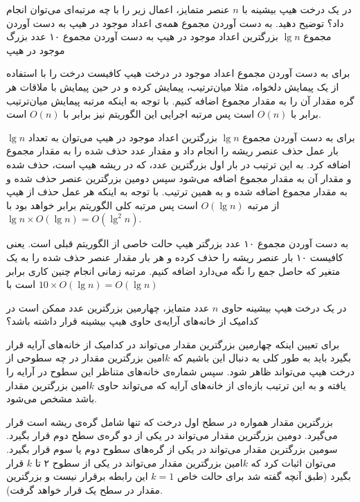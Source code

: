 
 در یک درخت هیپ بیشینه با {$n$} عنصر متمایز، اعمال زیر را با چه مرتبه‌ای می‌توان انجام داد؟ توضیح دهید.
 به دست آوردن مجموع همه‌ی اعداد موجود در هیپ
 به دست آوردن مجموع {$\lg n$} بزرگترین اعداد موجود در هیپ
 به دست آوردن مجموع ۱۰ عدد بزرگ موجود در هیپ


برای به دست آوردن مجموع  اعداد موجود در درخت هیپ کافیست درخت را با استفاده از یک پیمایش دلخواه، مثلا میان‌ترتیب، پیمایش کرده و در حین پیمایش با ملاقات هر گره مقدار آن را به مقدار مجموع اضافه کنیم. با توجه به اینکه مرتبه پیمایش میان‌ترتیب برابر با {$O(n)$} است پس مرتبه اجرایی این الگوریتم نیز برابر با {$O(n)$} است.

برای به دست آوردن مجموع {$\lg n$} بزرگترین اعداد موجود در هیپ می‌توان به تعداد {$\lg n$} بار عمل حذف عنصر ریشه را انجام داد و مقدار عدد حذف شده را به مقدار مجموع اضافه کرد. به این ترتیب در بار اول بزرگترین عدد، که در ریشه هیپ است، حذف شده و مقدار آن به مقدار مجموع اضافه می‌شود سپس دومین بزرگترین عنصر حذف شده و به مقدار مجموع اضافه شده و به همین ترتیب. با توجه به اینکه هر عمل حذف از هیپ از مرتبه {$O(\lg n)$} است پس مرتبه کلی الگوریتم برابر خواهد بود با {$\lg n \times O(\lg n)=O({\lg}^2 n)$}.

به دست آوردن مجموع ۱۰ عدد بزرگتر هیپ حالت خاصی از الگوریتم قبلی است. یعنی کافیست ۱۰ بار عنصر ریشه را حذف کرده و هر بار مقدار عنصر حذف شده را به یک متغیر که حاصل جمع را نگه می‌دارد اضافه کنیم. مرتبه زمانی انجام چنین کاری برابر است با {$10\times O(\lg n)=O(\lg n)$}

 در یک درخت هیپ بیشینه حاوی {$n$} عدد متمایز، چهارمین بزرگترین عدد ممکن است در کدامیک از خانه‌های آرایه‌ی حاوی هیپ بیشینه قرار داشته باشد؟‌


برای تعیین اینکه چهارمین بزرگترین مقدار می‌تواند در کدامیک از خانه‌های آرایه قرار بگیرد باید به طور کلی به دنبال این باشیم که {$k$}امین بزرگترین مقدار در چه سطوحی از درخت هیپ می‌تواند ظاهر شود. سپس شماره‌ی خانه‌های متناظر این سطوح در آرایه را یافته و به این ترتیب بازه‌ای از خانه‌های آرایه که می‌تواند حاوی {$k$}امین بزرگترین مقدار باشد مشخص می‌شود.

بزرگترین مقدار همواره در سطح اول درخت که تنها شامل گره‌ی ریشه است قرار می‌گیرد. دومین بزرگترین مقدار می‌تواند در یکی از دو گره‌ی سطح دوم قرار بگیرد. سومین بزرگترین مقدار می‌تواند در یکی از گره‌های سطوح دوم یا سوم قرار بگیرد. می‌توان اثبات کرد که {$k$}امین بزرگترین مقدار می‌تواند در یکی از سطوح ۲ تا {$k$} قرار بگیرد (طبق آنچه گفته شد برای حالت خاص {$k=1$} این رابطه برقرار نیست و بزرگترین مقدار در سطح یک قرار خواهد گرفت).

